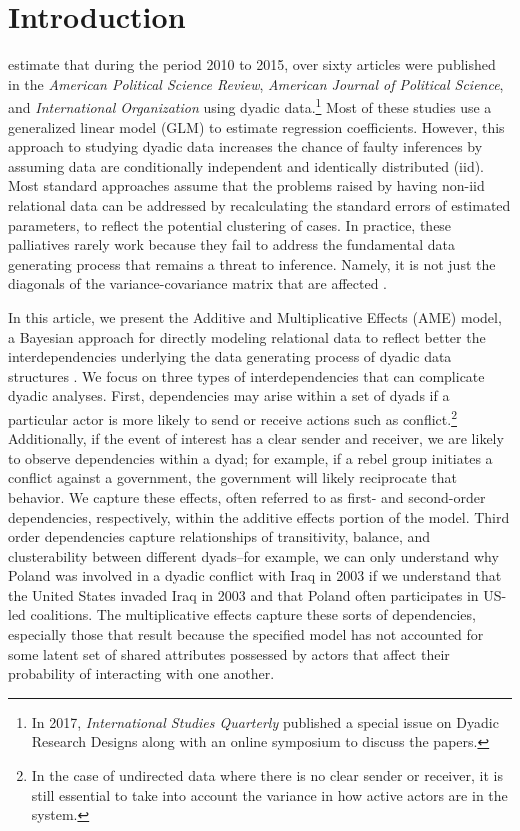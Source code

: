 \section{\textbf{Introduction}}

\citet{aronow:etal:2015} estimate that during the period 2010 to 2015, over sixty articles were published in the \textit{American Political Science Review}, \textit{American Journal of Political Science}, and \textit{International Organization} using dyadic data.\footnote{In 2017, \textit{International Studies Quarterly} published a special issue on Dyadic Research Designs along with an online symposium to discuss the papers.} Most of these studies use a generalized linear model (GLM) to estimate regression coefficients.  However, this approach to studying dyadic data increases the chance of faulty inferences by assuming data are conditionally independent and identically distributed (iid). Most standard approaches assume that the problems raised by having non-iid relational data can be addressed by recalculating the standard errors of estimated parameters, to reflect the potential clustering of cases. In practice, these palliatives rarely work because they fail to address the fundamental data generating process that remains a threat to inference. Namely, it is not just the diagonals of the variance-covariance matrix that are affected \citep{beck:2012,franzese:hayes:2007,king:roberts:2014}. 

In this article, we present the Additive and Multiplicative Effects (AME) model, a Bayesian approach for directly modeling relational data to reflect better the interdependencies underlying the data generating process of dyadic data structures \citep{hoff:2008,minhas:etal:2016:arxiv}. We focus on three types of interdependencies that can complicate dyadic analyses. First, dependencies may arise within a set of dyads if a particular actor is more likely to send or receive actions such as conflict.\footnote{In the case of undirected data where there is no clear sender or receiver, it is still essential to take into account the variance in how active actors are in the system.} Additionally, if the event of interest has a clear sender and receiver, we are likely to observe dependencies within a dyad; for example, if a rebel group initiates a conflict against a government, the government will likely reciprocate that behavior. We capture these effects, often referred to as first- and second-order dependencies, respectively, within the additive effects portion of the model. Third order dependencies capture relationships of transitivity, balance, and clusterability between different dyads--for example, we can only understand why Poland was involved in a dyadic conflict with Iraq in 2003 if we understand that the United States invaded Iraq in 2003 and that Poland often participates in US-led coalitions. The multiplicative effects capture these sorts of dependencies, especially those that result because the specified model has not accounted for some latent set of shared attributes possessed by actors that affect their probability of interacting with one another.  

